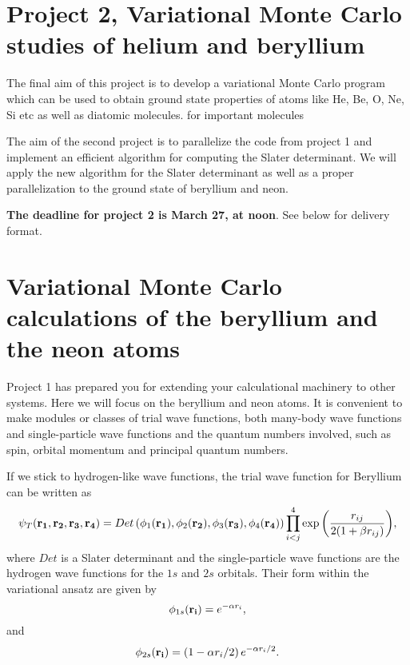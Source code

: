 \documentclass[10pt]{article}
\begin{document}
\section*{Project 2, Variational Monte Carlo studies of helium and beryllium}

The final aim of this project is to develop a variational Monte Carlo program which can be used to obtain ground state properties of atoms like He, Be, O, Ne, Si etc as well as diatomic molecules. 
for important molecules 

The aim of the second project  is to parallelize the code from project 1 and implement an efficient algorithm for computing the Slater determinant. We will apply the new algorithm for the Slater determinant as well as a proper parallelization to the ground state of beryllium and neon.

{\bf The deadline for project 2 is March 27, at noon}.  See below for delivery format.


\section*{Variational Monte Carlo calculations of the beryllium and the neon atoms}
Project 1 has prepared you for extending your calculational machinery  to other systems.
Here we will focus on the  beryllium and neon atoms.
It is convenient to make modules or classes of trial wave functions, both many-body wave functions
and single-particle wave functions  and the quantum numbers  involved, such as spin, orbital momentum and principal
quantum numbers.

If we stick to hydrogen-like wave functions,
the trial wave function for Beryllium can be written as 
\begin{equation}
   \psi_{T}({\bf r_1},{\bf r_2}, {\bf r_3}, {\bf r_4}) = 
   Det\left(\phi_{1}({\bf r_1}),\phi_{2}({\bf r_2}),
   \phi_{3}({\bf r_3}),\phi_{4}({\bf r_4})\right)
   \prod_{i<j}^{4}\exp{\left(\frac{r_{ij}}{2(1+\beta r_{ij})}\right)}, 
\end{equation}
where $Det$ is a Slater determinant and the single-particle wave functions
are the hydrogen wave functions for the $1s$ and $2s$ orbitals. Their form
within the variational ansatz are given by
\begin{equation}
\phi_{1s}({\bf r_i}) = e^{-\alpha r_i},
\end{equation}
and 
\begin{equation}
\phi_{2s}({\bf r_i}) = \left(1-\alpha r_i/2\right)e^{-\alpha r_i/2}.
\end{equation}
\end{document}

